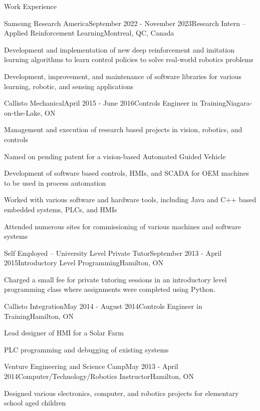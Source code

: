 \documentclass[usenames, dvipsnames]{resume} %
\begin{document}
\begin{rSection}{Work Experience}

\begin{rSubsection}{Samsung Research America}{September 2022 - November 2023}{Research Intern -- Applied Reinforcement Learning}{Montreal, QC, Canada}
	\item Development and implementation of new deep reinforcement and imitation learning algorithms to learn control policies to solve real-world robotics problems
	\item Development, improvement, and maintenance of software libraries for various learning, robotic, and sensing applications
\end{rSubsection}

\begin{rSubsection}{Callisto Mechanical}{April 2015 - June 2016}{Controls Engineer in Training}{Niagara-on-the-Lake, ON}
\item Management and execution of research based projects in vision, robotics, and controls
\item Named on pending patent for a vision-based Automated Guided Vehicle
\item Development of software based controls, HMIs, and SCADA for OEM machines to be used in process automation
\item Worked with various software and hardware tools, including Java and C++ based embedded systems, PLCs, and HMIs
\item Attended numerous sites for commissioning of various machines and software systems
\end{rSubsection}

\begin{rSubsection}{Self Employed -- University Level Private Tutor}{September 2013 - April 2015}{Introductory Level Programming}{Hamilton, ON}
	\item Charged a small fee for private tutoring sessions in an introductory level programming class where assignments were completed using Python.
\end{rSubsection}

\begin{rSubsection}{Callisto Integration}{May 2014 - August 2014}{Controls Engineer in Training}{Hamilton, ON}
	\item Lead designer of HMI for a Solar Farm
	\item PLC programming and debugging of existing systems
\end{rSubsection}

\begin{rSubsection}{Venture Engineering and Science Camp}{May 2013 - April 2014}{Computer/Technology/Robotics Instructor}{Hamilton, ON}
	\item Designed various electronics, computer, and robotics projects for elementary school aged children
\end{rSubsection}


\end{rSection}
\end{document}
